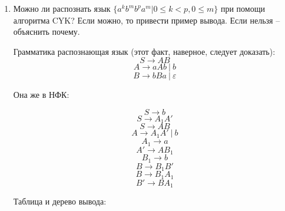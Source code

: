 \documentclass[12pt]{article}
\begin{document}
\bigskip
\begin{enumerate}
 \item Можно ли распознать язык $\{a^kb^mb^pa^m | 0 \leq k < p, 0 \leq m\}$ при помощи алгоритма CYK? 
    Если можно, то привести пример вывода.
    Если нельзя -- объяснить почему.

        Грамматика распознающая язык (этот факт, наверное, следует доказать):
        \[
            S \rightarrow A B
        \]
        \[
            A \rightarrow a A b~|~b
        \]
        \[
            B \rightarrow b B a~|~\varepsilon
        \]

        Она же в НФК:

        \[
            S \rightarrow b
        \]
        \[
            S \rightarrow A_1 A'
        \]
        \[
            S \rightarrow A B
        \]
        \[
            A \rightarrow  A_1 A'~|~b
        \]
        \[
            A_1 \rightarrow a
        \]
        \[
            A' \rightarrow A B_1
        \]
        \[
            B_1 \rightarrow b
        \]
        \[
            B \rightarrow B_1 B'
        \]
        \[
            B \rightarrow B_1 A_1
        \]
        \[
            B' \rightarrow B A_1
        \]

        Таблица и дерево вывода:


\end{enumerate}
\end{document}

